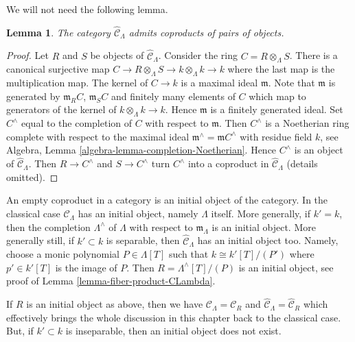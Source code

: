 \documentclass{stacks-project}
\theoremstyle{plain}
\newtheorem{lemma}[subsection]{Lemma}
\theoremstyle{definition}
\theoremstyle{remark}
\numberwithin{equation}{subsection}
\begin{document}
\noindent
We will not need the following lemma.

\begin{lemma}
\label{lemma-CLambdahat-coproducts}
The category $\widehat{\mathcal{C}}_\Lambda$ admits coproducts
of pairs of objects.
\end{lemma}

\begin{proof}
Let $R$ and $S$ be objects of $\widehat{\mathcal{C}}_\Lambda$.
Consider the ring $C = R \otimes_\Lambda S$. There is a canonical
surjective map $C \to R \otimes_\Lambda S \to k \otimes_\Lambda k \to k$
where the last map is the multiplication map. The kernel of
$C \to k$ is a maximal ideal $\mathfrak m$. Note that $\mathfrak m$
is generated by $\mathfrak m_R C$, $\mathfrak m_S C$ and finitely many
elements of $C$ which map to generators of the kernel of
$k \otimes_\Lambda k \to k$. Hence $\mathfrak m$ is a finitely
generated ideal. Set
$C^\wedge$ equal to the completion of $C$ with respect to $\mathfrak m$.
Then $C^\wedge$ is a Noetherian ring complete with respect to
the maximal ideal $\mathfrak m^\wedge = \mathfrak mC^\wedge$
with residue field $k$, see
Algebra, Lemma \ref{algebra-lemma-completion-Noetherian}.
Hence $C^\wedge$ is an object of $\widehat{\mathcal{C}}_\Lambda$.
Then $R \to C^\wedge$ and $S \to C^\wedge$ turn $C^\wedge$
into a coproduct in $\widehat{\mathcal{C}}_\Lambda$ (details omitted).
\end{proof}

\noindent
An empty coproduct in a category is an initial object of the category.
In the classical case $\widehat{\mathcal{C}}_\Lambda$ has an initial
object, namely $\Lambda$ itself. More generally, if $k' = k$, then
the completion $\Lambda^\wedge$ of $\Lambda$ with respect to
$\mathfrak m_\Lambda$ is an initial object. More generally still, if
$k' \subset k$ is separable, then $\widehat{\mathcal{C}}_\Lambda$ has an
initial object too. Namely, choose a monic polynomial $P \in \Lambda[T]$
such that $k \cong k'[T]/(P')$ where $p' \in k'[T]$ is the image
of $P$. Then $R = \Lambda^\wedge[T]/(P)$ is an initial object, see proof of
Lemma \ref{lemma-fiber-product-CLambda}.

\medskip\noindent
If $R$ is an initial object as above, then we have
$\mathcal{C}_\Lambda = \mathcal{C}_R$ and
$\widehat{\mathcal{C}}_\Lambda = \widehat{\mathcal{C}}_R$ which effectively
brings the whole discussion in this chapter back to the classical case.
But, if $k' \subset k$ is inseparable, then an initial object does not
exist.
\end{document}
